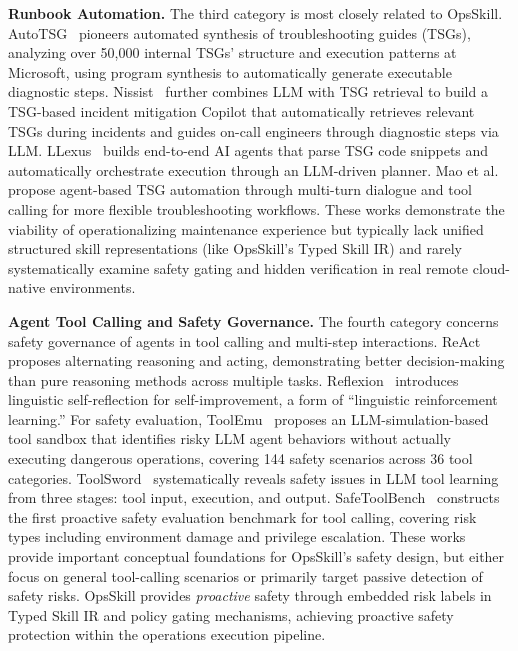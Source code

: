 \documentclass[conference,10pt]{IEEEtran}
\begin{document}
\textbf{Runbook Automation.}
The third category is most closely related to OpsSkill.
AutoTSG~\cite{shetty2022autotsg} pioneers automated synthesis of troubleshooting guides (TSGs), analyzing over 50,000 internal TSGs' structure and execution patterns at Microsoft, using program synthesis to automatically generate executable diagnostic steps.
Nissist~\cite{an2024nissist} further combines LLM with TSG retrieval to build a TSG-based incident mitigation Copilot that automatically retrieves relevant TSGs during incidents and guides on-call engineers through diagnostic steps via LLM.
LLexus~\cite{lascasas2024llexus} builds end-to-end AI agents that parse TSG code snippets and automatically orchestrate execution through an LLM-driven planner.
Mao et al.~\cite{mao2025agentic_tsg} propose agent-based TSG automation through multi-turn dialogue and tool calling for more flexible troubleshooting workflows.
These works demonstrate the viability of operationalizing maintenance experience but typically lack unified structured skill representations (like OpsSkill's Typed Skill IR) and rarely systematically examine safety gating and hidden verification in real remote cloud-native environments.

\textbf{Agent Tool Calling and Safety Governance.}
The fourth category concerns safety governance of agents in tool calling and multi-step interactions.
ReAct~\cite{yao2023react} proposes alternating reasoning and acting, demonstrating better decision-making than pure reasoning methods across multiple tasks.
Reflexion~\cite{shinn2023reflexion} introduces linguistic self-reflection for self-improvement, a form of ``linguistic reinforcement learning.''
For safety evaluation, ToolEmu~\cite{ruan2023toolemu} proposes an LLM-simulation-based tool sandbox that identifies risky LLM agent behaviors without actually executing dangerous operations, covering 144 safety scenarios across 36 tool categories.
ToolSword~\cite{ye2024toolsword} systematically reveals safety issues in LLM tool learning from three stages: tool input, execution, and output.
SafeToolBench~\cite{xia2024safetoolbench} constructs the first proactive safety evaluation benchmark for tool calling, covering risk types including environment damage and privilege escalation.
These works provide important conceptual foundations for OpsSkill's safety design, but either focus on general tool-calling scenarios or primarily target passive detection of safety risks.
OpsSkill provides \emph{proactive} safety through embedded risk labels in Typed Skill IR and policy gating mechanisms, achieving proactive safety protection within the operations execution pipeline.
\end{document}
